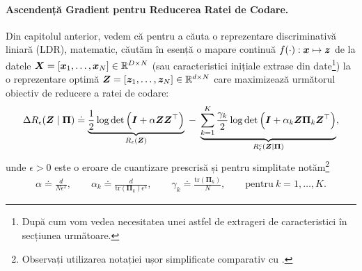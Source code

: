 \documentclass[../../book-main_ro.tex]{subfiles}
\begin{document}
\paragraph{Ascendență Gradient pentru Reducerea Ratei de Codare.} Din capitolul anterior, vedem că pentru a căuta o reprezentare discriminativă liniară (LDR), matematic, căutăm în esență o mapare continuă $f(\cdot): \bm{x} \mapsto \bm{z}$ de la datele $\bm{X} = [\bm{x}_1, \ldots, \bm{x}_N] \in \mathbb{R}^{D \times N}$ (sau caracteristici inițiale extrase din date\footnote{După cum vom vedea necesitatea unei astfel de extrageri de caracteristici în secțiunea următoare.}) la o reprezentare optimă $\bm{Z} = [\bm{z}_1, \ldots, \bm{z}_N] \in \mathbb{R}^{d \times N}$ care maximizează următorul obiectiv de reducere a ratei de codare:
\begin{equation}\label{eq:mcr-formulation}
\begin{split}
\Delta R_{\epsilon}(\bm{Z} \mid \bm{\Pi}) \doteq \underbrace{\frac{1}{2}\log\det \Big(\bm{I} + {\alpha} \bm{Z} \bm{Z}^{\top} \Big)}_{R_{\epsilon}(\bm{Z})} \;-\; \underbrace{\sum_{k=1}^{K}\frac{\gamma_{k}}{2} \log\det\Big(\bm{I} + {\alpha_{k}} \bm{Z} \bm{\Pi}_{k} \bm{Z}^{\top} \Big)}_{R_{\epsilon}^c(\bm{Z} \mid \bm \Pi)},
\end{split}
\end{equation}
unde $\epsilon > 0$ este o eroare de cuantizare prescrisă și pentru simplitate notăm\footnote{Observați utilizarea notației ușor simplificate comparativ cu .}
\begin{align*}
    \alpha \doteq \frac{d}{N\epsilon^2}, \qquad \alpha_{k} \doteq \frac{d}{\mathrm{tr}(\bm{\Pi}_{k})\epsilon^2}, \qquad \gamma_{k} \doteq \frac{\mathrm{tr}(\bm{\Pi}_{k})}{N}, \qquad \text{pentru}\ k = 1,\ldots, K.
\end{align*}
\end{document}

